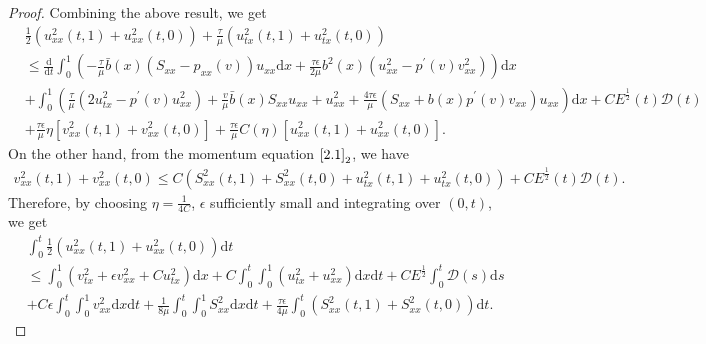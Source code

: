 \documentclass[10pt,reqno]{amsart}
\numberwithin{equation}{section}
\newcommand{\dif}{\mathrm{d}}
\begin{document}
\begin{proof}
Combining the above result, we get
\begin{align*}
&\frac{1}{2} (u_{xx}^2(t,1)+u_{xx}^2(t,0))+\frac{\tau}{\mu} (u_{tx}^2 (t,1)+u_{tx}^2(t,0))\\
&\le \frac{\dif}{\dif t} \int_0^1 \left(-\frac{\tau}{\mu} \bar b(x) (S_{xx}-p_{xx}(v))u_{xx}\dif x+\frac{\tau \epsilon}{2\mu} b^2(x)(u_{xx}^2-p^\prime(v) v_{xx}^2)\right)\dif x\\
&+ \int_0^1\left( \frac{\tau}{\mu}(2 u_{tx}^2-p^\prime(v) u_{xx}^2 )+ \frac{v}{\mu} \bar b(x) S_{xx} u_{xx}+ u_{xx}^2+\frac{4\tau\epsilon}{\mu}  (S_{xx}+b(x)p^\prime(v) v_{xx}) u_{xx}\right) \dif x+C E^\frac{1}{2}(t)\mathcal D(t)\\
&+\frac{\tau\epsilon}{\mu} \eta[ v_{xx}^2(t,1)+v_{xx}^2(t,0)]+\frac{\tau\epsilon}{\mu} C(\eta) [u_{xx}^2(t,1)+u_{xx}^2(t,0)] .
\end{align*}
On the other hand, from the momentum equation $\eqref{2.1}_2$, we have
\begin{align*}
v_{xx}^2(t,1)+v_{xx}^2(t,0)\le C (S_{xx}^2(t,1)+S_{xx}^2(t,0)+u_{tx}^2(t,1)+u_{tx}^2(t,0))+C E^\frac{1}{2}(t)\mathcal D(t).
\end{align*}
Therefore, by choosing $\eta=\frac{1}{4C} $, $\epsilon$ sufficiently small and  integrating over $(0, t)$, we get
\begin{align}
&\int_0^t \frac{1}{2} (u_{xx}^2(t,1)+u_{xx}^2(t,0)) \dif t \nonumber\\
&\le \int_0^1 (v_{tx}^2+\epsilon  v_{xx}^2 +C u_{tx}^2)\dif x+C  \int_0^t\int_0^1 (u_{tx}^2+u_{xx}^2 )\dif x \dif t+CE^\frac{1}{2}\int_0^t \mathcal D(s)\dif s \nonumber\\
&+C \epsilon \int_0^t\int_0^1 v_{xx}^2\dif x \dif t +\frac{1}{8\mu} \int_0^t\int_0^1 S_{xx}^2 \dif x \dif t
+\frac{\tau \epsilon}{4\mu} \int_0^t (S_{xx}^2(t,1)+S_{xx}^2(t, 0)) \dif t . \label{3.28}
\end{align}


\end{proof}
\end{document}
